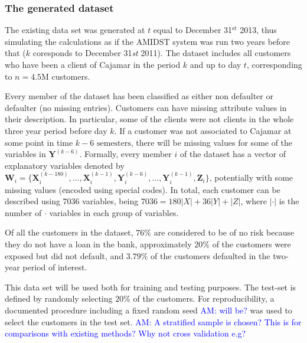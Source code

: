 \documentclass{article}
\theoremstyle{theorem}
\theoremstyle{definition}
\newcommand{\W}{\mathbf{W}}
\newcommand{\X}{\mathbf{X}}
\newcommand{\Y}{\mathbf{Y}}
\newcommand{\Z}{\mathbf{Z}}
\begin{document}
\subsubsection{The generated dataset}

The existing data set was generated at $t$ equal to December 31$^\text{st}$ 2013, thus simulating the calculations as if the AMIDST system was run two years before that ($k$ coresponds to December 31\textit{st} 2011). 
The dataset includes all customers who have been a client of Cajamar in the period  $k$ and up to day $t$, corresponding to $n=4.5\text{M}$ customers. 

Every member of the dataset has been classified as either non defaulter or defaulter (no missing entries). 
Customers can have missing attribute values in their description. In particular, some of the clients were not clients in the whole three year period before day $k$. If a customer was not associated to Cajamar at some point in time $k - 6 \mbox{ semesters}$, there will be missing values for some of the variables in $\Y^{(k-6)}$. 
Formally, every member $i$ of the dataset  has a vector of explanatory variables denoted by $\W_i=\{ \X_i^{(k-180)}, \ldots, \X_i^{(k-1)}, \Y_i^{(k-6)},\ldots, \Y_i^{(k-1)},\Z_i\}$, potentially with some missing values (encoded using special codes). 
In total, each customer can be described using $7036$ variables, being $7036 = 180|X| + 36|Y| + |Z|$, where $|\cdot|$ is the number of $\cdot$ variables in each group of variables.

Of all the customers in the dataset, $76\%$ are considered to be of no risk because they do not have a loan in the bank, approximately $20\%$ of the customers were exposed but did not default, and $3.79\%$ of the customers  defaulted in the two-year period of interest. 

This data set will be used both for training and testing purposes. The test-set is defined by randomly selecting $20\%$ of the customers. For reproducibility, a documented procedure including a fixed random seed \textcolor{blue}{AM: will be?} was used to select the customers in the test set. \textcolor{blue}{AM: A stratified sample is chosen? This is for comparisons with existing methods? Why not cross validation e.g?}
\end{document}
